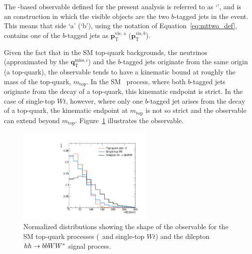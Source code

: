 The \mttwo-based observable defined for the present analysis is referred to as `\mtbb',
and is an \mttwo construction in which the visible objects are the two $b$-tagged jets in the event.
This means that side `a' (`b'), using the notation of Equation~\ref{eq:mttwo_def}, contains
one of the $b$-tagged jets as $\bm{p}_{\text{T}}^{\text{vis, a}}$ ($\bm{p}_{\text{T}}^{\text{vis}, b}$).

Given the fact that in the SM top-quark backgrounds, the neutrinos (approximated by the $\bm{q}_{\text{T}}^{\text{miss}, i}$)
and the $b$-tagged jets originate from the same origin (a top-quark), the \mtbb observable tends
to have a kinematic bound at roughly the mass of the top-quark, $m_{\text{top}}$.
In the SM \ttbar~process, where both $b$-tagged jets originate from the decay of a top-quark, this kinematic
endpoint is strict.
In the case of single-top $Wt$, however, where only one $b$-tagged jet arises from the decay of a
top-quark, the kinematic endpoint at $m_{\text{top}}$ is not so strict and the \mtbb observable can extend beyond $m_{\text{top}}$.
Figure~\ref{fig:hh_shape_mtbb} illustrates the \mtbb observable.

\begin{figure}[!htb]
    \begin{center}
        \includegraphics[width=0.6\textwidth]{figures/search_hh/signal_pheno/shape_plots/hh_shape_plot_mt2_bb}
        \caption{
            Normalized distributions showing the shape of the \mtbb observable for the SM
            top-quark processes (\ttbar~and single-top $Wt$) and the dilepton $hh \rightarrow bbWW^*$ signal process.
        }
        \label{fig:hh_shape_mtbb}
    \end{center}
\end{figure}


